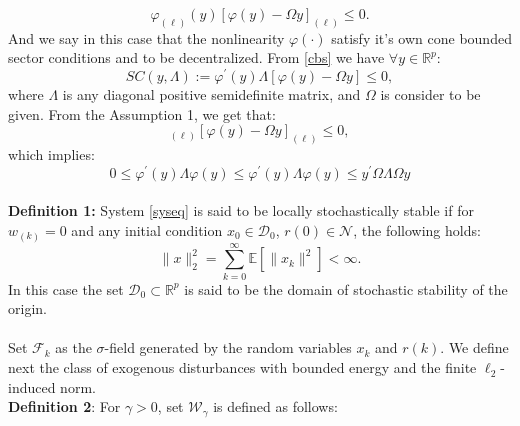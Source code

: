 \documentclass[conference]{IEEEtran}
\begin{document}
\begin{equation}\label{cbs}
\varphi_{(\ell)}(y)[\varphi(y)-\varOmega y ]_{(\ell)}\leq 0.
\end{equation}
And we say in this case that the nonlinearity $\varphi(\cdot) $ satisfy it's own cone bounded sector conditions and to be decentralized. From \eqref{cbs} we have $\forall y\in\mathbb{R}^p$:
\begin{equation}\label{scieq}
	SC(y,\varLambda):= \varphi^{\mathrm{'}}(y)\varLambda[\varphi(y)-\varOmega y]\leq0,
\end{equation}
where $\varLambda$ is any diagonal positive semidefinite matrix, and $\varOmega$ is consider to be given. From the Assumption 1, we get that:
\begin{equation}
[\varOmega y]_{(\ell)}[\varphi(y)-\varOmega y]_{(\ell)}\leq0,
\end{equation}
which implies:
\begin{equation}
 0\leq\varphi^{\mathrm{'}}(y)\varLambda\varphi(y) \leq \varphi^{\mathrm{'}}(y)\varLambda\varphi(y) \leq y^{\mathrm{'}}\varOmega\varLambda\varOmega y
\end{equation}\\
\textbf{Definition 1:} System \eqref{syseq} is said to be locally stochastically stable if for $w_(k)=0$ and any initial condition $x_0\in \mathcal{D}_0$, $r(0)\in \mathcal{N}$, the following holds:
\begin{equation}
	\|x\|^2_2=\sum_{k=0}^{\infty}\mathbb{E}[\|x_k\|^2]<\infty.
\end{equation} 
In this case the set $\mathcal{D}_0 \subset \mathbb{R}^{p}$ is said to be the domain of stochastic stability of the origin. \\
\\
Set $\mathcal{F}_k$ as the $\sigma$-field generated by the random variables $x_k$ and $r(k)$. We define next the class of exogenous disturbances with bounded energy and the finite $\ell_2$-induced norm.
\\
\textbf{Definition 2}: For $\gamma>0$, set $\mathcal{W}_{\gamma}$ is defined as follows:
\end{document}
